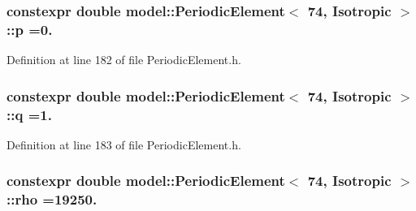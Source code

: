 \hypertarget{structmodel_1_1_periodic_element_3_0174_00_01_isotropic_01_4_a64606e223a62410ddc1a73fb1f88db2a}{}
\subsubsection[{p}]{\setlength{\rightskip}{0pt plus 5cm}constexpr double {\bf model\+::\+Periodic\+Element}$<$ 74, {\bf Isotropic} $>$\+::p =0.\hspace{0.3cm}{\ttfamily [static]}}\label{structmodel_1_1_periodic_element_3_0174_00_01_isotropic_01_4_a64606e223a62410ddc1a73fb1f88db2a}


Definition at line 182 of file Periodic\+Element.\+h.

\hypertarget{structmodel_1_1_periodic_element_3_0174_00_01_isotropic_01_4_ab51d25748f4cbefccda8d74d4cff4ba6}{}
\subsubsection[{q}]{\setlength{\rightskip}{0pt plus 5cm}constexpr double {\bf model\+::\+Periodic\+Element}$<$ 74, {\bf Isotropic} $>$\+::q =1.\hspace{0.3cm}{\ttfamily [static]}}\label{structmodel_1_1_periodic_element_3_0174_00_01_isotropic_01_4_ab51d25748f4cbefccda8d74d4cff4ba6}


Definition at line 183 of file Periodic\+Element.\+h.

\hypertarget{structmodel_1_1_periodic_element_3_0174_00_01_isotropic_01_4_abee0fd68a202b509d989425423a9df45}{}
\subsubsection[{rho}]{\setlength{\rightskip}{0pt plus 5cm}constexpr double {\bf model\+::\+Periodic\+Element}$<$ 74, {\bf Isotropic} $>$\+::rho =19250.\hspace{0.3cm}{\ttfamily [static]}}\label{structmodel_1_1_periodic_element_3_0174_00_01_isotropic_01_4_abee0fd68a202b509d989425423a9df45}


